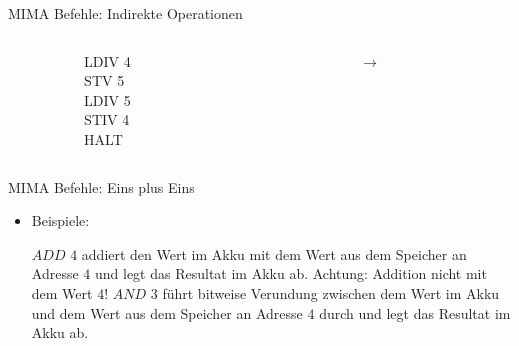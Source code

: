 \documentclass[handout]{beamer}
\begin{document}
\begin{frame}{MIMA Befehle: Indirekte Operationen}
	\bp 
	\vspace{.5cm}
	\vspace{.4cm}
	
	\begin{columns}
        \begin{column}{0.06\textwidth}
        \end{column}

		\begin{column}{0.15\textwidth}
			LDIV 4 \\ STV 5 \\ LDIV 5 \\ STIV 4 \\ HALT
		\end{column}

        \vline
        \begin{column}{0.06\textwidth}
        \end{column}
		
		\begin{column}{0.24\textwidth}
			\begin{memory}
			\end{memory}
		\end{column}
		\begin{column}{0.02\textwidth}
            $\rightarrow$
		\end{column}
		\begin{column}{0.3\textwidth}
			\begin{memory}
				\memrow{$4$}{$6$}	
				\memrow{$5$}{$7$}
				\memrow{$6$}{$2$}
				\memrow{$7$}{$2$}
			\end{memory}
		\end{column}
	\end{columns}
\end{frame}

\begin{frame}{MIMA Befehle: Eins plus Eins}
	\begin{itemize}
		\pitem Befehle zu arithmetischen Operationen
		\pitem Eine ALU-Operation, angewandt auf dem Wert des Akkus und dem Wert an gegebener Adresse
		
		\bp
		
		\item Beispiele:
		\begin{itemize}
			\pitem $ADD$ $4$ addiert den Wert im Akku mit dem Wert aus dem Speicher an Adresse $4$ und legt das Resultat im Akku ab\ip . Achtung: Addition nicht mit dem Wert $4$!
			\pitem $AND$ $3$ führt bitweise Verundung zwischen dem Wert im Akku und dem Wert aus dem Speicher an Adresse $4$ durch und legt das Resultat im Akku ab.
		\end{itemize}
	\end{itemize}
\end{frame}
\end{document}
